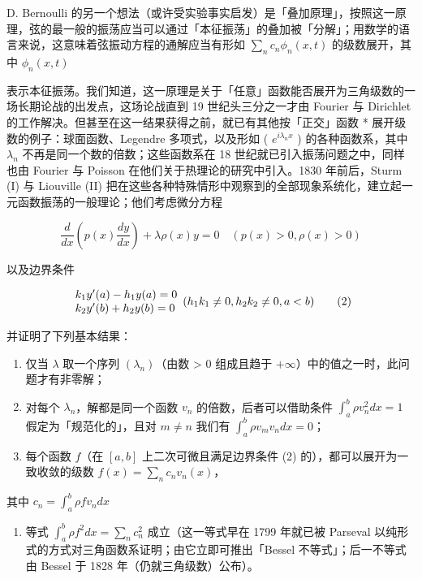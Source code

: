 D. Bernoulli 的另一个想法（或许受实验事实启发）是「叠加原理」，按照这一原理，弦的最一般的振荡应当可以通过「本征振荡」的叠加被「分解」；用数学的语言来说，这意味着弦振动方程的通解应当有形如 \(\sum_{n} c_{n} \phi_{n}(x, t)\) 的级数展开，其中 \(\phi_{n}(x, t)\)

表示本征振荡。我们知道，这一原理是关于「任意」函数能否展开为三角级数的一场长期论战的出发点，这场论战直到 19 世纪头三分之一才由 Fourier 与 Dirichlet 的工作解决。但甚至在这一结果获得之前，就已有其他按「正交」函数 * 展开级数的例子：球面函数、Legendre 多项式，以及形如 ( \(e^{i\lambda_n x}\) ) 的各种函数系，其中 \(\lambda_n\) 不再是同一个数的倍数；这些函数系在 18 世纪就已引入振荡问题之中，同样也由 Fourier 与 Poisson 在他们关于热理论的研究中引入。1830 年前后，Sturm (I) 与 Liouville (II) 把在这些各种特殊情形中观察到的全部现象系统化，建立起一元函数振荡的一般理论；他们考虑微分方程

\[
\frac {d}{d x} \left(p (x) \frac {d y}{d x}\right) + \lambda \rho (x) y = 0 \quad (p (x) > 0, \rho (x) > 0)\tag{1}
\]

以及边界条件

\[
\begin{array}{l l} k _ {1} y ^ {\prime} (a) - h _ {1} y (a) = 0 \\ k _ {2} y ^ {\prime} (b) + h _ {2} y (b) = 0 \end{array} (h _ {1} k _ {1} \neq 0, h _ {2} k _ {2} \neq 0, a <   b)\tag{2}
\]

并证明了下列基本结果：

\begin{enumerate}
\def\labelenumi{\arabic{enumi})}
\item
  仅当 \(\lambda\) 取一个序列 \((\lambda_{n})\)（由数 > 0 组成且趋于 \(+\infty\)）中的值之一时，此问题才有非零解；
\item
  对每个 \(\lambda_{n}\)，解都是同一个函数 \(v_{n}\) 的倍数，后者可以借助条件 \(\int_{a}^{b} \rho v_{n}^{2} dx = 1\) 假定为「规范化的」，且对 \(m \neq n\) 我们有 \(\int_{a}^{b} \rho v_{m} v_{n} dx = 0\)；
\item
  每个函数 \(f\)（在 \([a, b]\) 上二次可微且满足边界条件 (2) 的），都可以展开为一致收敛的级数 \(f(x) = \sum_{n} c_{n} v_{n}(x)\)，
\end{enumerate}

其中 \(c_{n} = \int_{a}^{b}\rho fv_{n}dx\)

\begin{enumerate}
\def\labelenumi{\arabic{enumi})}
\setcounter{enumi}{3}
\tightlist
\item
  等式 \(\int_{a}^{b}\rho f^2 dx = \sum_n c_n^2\) 成立（这一等式早在 1799 年就已被 Parseval 以纯形式的方式对三角函数系证明；由它立即可推出「Bessel 不等式」；后一不等式由 Bessel 于 1828 年（仍就三角级数）公布）。
\end{enumerate}

